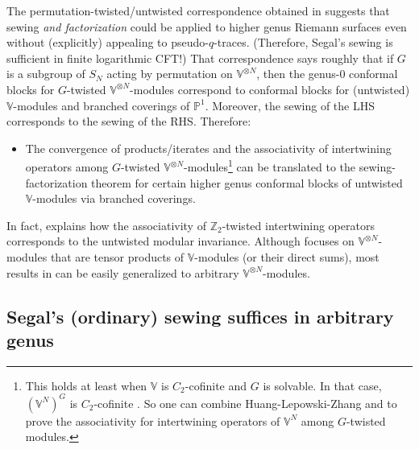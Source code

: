 \documentclass[11pt,b5paper,notitlepage]{article}
\theoremstyle{definition}
\theoremstyle{plain}
\newcommand{\Vbb}{\mathbb V}
\newcommand{\Zbb}{\mathbb Z}
\newcommand{\Pbb}{\mathbb P}
\newcommand{\<}{\left\langle}
\renewcommand{\>}{\right\rangle}
\numberwithin{equation}{section}
\begin{document}
The permutation-twisted/untwisted correspondence obtained in \cite{Gui-permutation} suggests that sewing \textit{and factorization} could be applied to higher genus Riemann surfaces even without (explicitly) appealing to pseudo-$q$-traces. (Therefore, Segal's sewing is sufficient in finite logarithmic CFT!) That correspondence says roughly that if $G$ is a subgroup of $S_N$ acting by permutation on $\Vbb^{\otimes N}$, then the genus-$0$ conformal blocks for $G$-twisted  $\Vbb^{\otimes N}$-modules correspond to conformal blocks for (untwisted) $\Vbb$-modules and branched coverings of $\Pbb^1$. Moreover, the sewing of the LHS corresponds to the sewing of the RHS. Therefore:
\begin{itemize}
\item The convergence of products/iterates and the associativity of intertwining operators among  $G$-twisted $\Vbb^{\otimes N}$-modules\footnote{This holds at least when $\Vbb$ is $C_2$-cofinite and $G$ is solvable. In that case, $(\Vbb^N)^G$ is $C_2$-cofinite \cite{Miy-C2-orbifold}. So one can combine Huang-Lepowski-Zhang and \cite{McR-equiv} to prove the associativity for intertwining operators of $\Vbb^N$ among $G$-twisted modules. } can be translated to the sewing-factorization theorem for certain higher genus conformal blocks of untwisted $\Vbb$-modules via branched coverings.
\end{itemize}
In fact, \cite[Sec. 0.2]{Gui-permutation} explains how the associativity of $\Zbb_2$-twisted intertwining operators corresponds to the untwisted modular invariance. Although \cite{Gui-permutation} focuses on $\Vbb^{\otimes N}$-modules that are tensor products of $\Vbb$-modules (or their direct sums), most results in \cite{Gui-permutation} can be easily generalized to arbitrary $\Vbb^{\otimes N}$-modules.


\subsection{Segal's (ordinary) sewing suffices in arbitrary genus}\label{lbb65}
\end{document}
